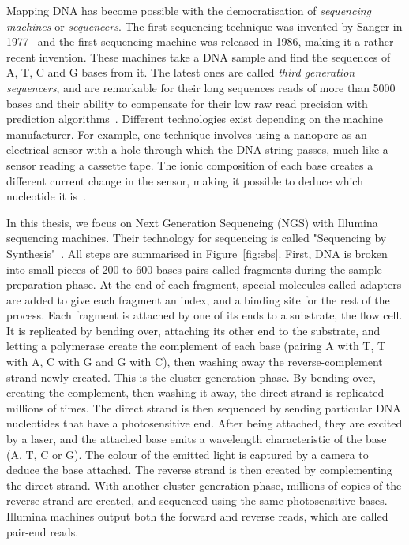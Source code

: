  Mapping DNA has become possible with the democratisation of \emph{sequencing machines} or \emph{sequencers}. The first sequencing technique was invented by Sanger in 1977~\cite{Sanger:sequencing} and the first sequencing machine was released in 1986, making it a rather recent invention. These machines take a DNA sample and find the sequences of A, T, C and G bases from it. The latest ones are called \emph{third generation sequencers}, and are remarkable for their long sequences reads of more than 5000 bases and their ability to compensate for their low raw read precision with prediction algorithms~\cite{Lee048603}. Different technologies exist depending on the machine manufacturer. For example, one technique involves using a nanopore as an electrical sensor with a hole through which the DNA string passes, much like a sensor reading a cassette tape. The ionic composition of each base creates a different current change in the sensor, making it possible to deduce which nucleotide it is~\cite{Oxford:nanopore}.

In this thesis, we focus on Next Generation Sequencing (NGS) with Illumina sequencing machines. Their technology for sequencing is called "Sequencing by Synthesis"~\cite{illumina:sbs}. All steps are summarised in Figure~\ref{fig:sbs}. First, DNA is broken into small pieces of 200 to 600 bases pairs called fragments during the sample preparation phase. At the end of each fragment, special molecules called adapters are added to give each fragment an index, and a binding site for the rest of the process. Each fragment is attached by one of its ends to a substrate, the flow cell. It is replicated by bending over, attaching its other end to the substrate, and letting a polymerase create the complement of each base (pairing A with T, T with A, C with G and G with C), then washing away the reverse-complement strand newly created. This is the cluster generation phase. By bending over, creating the complement, then washing it away, the direct strand is replicated millions of times. The direct strand is then sequenced by sending particular DNA nucleotides that have a photosensitive end. After being attached, they are excited by a laser, and the attached base emits a wavelength characteristic of the base (A, T, C or G). The colour of the emitted light is captured by a camera to deduce the base attached. The reverse strand is then created by complementing the direct strand. With another cluster generation phase, millions of copies of the reverse strand are created, and sequenced using the same photosensitive bases. Illumina machines output both the forward and reverse reads, which are called pair-end reads.

